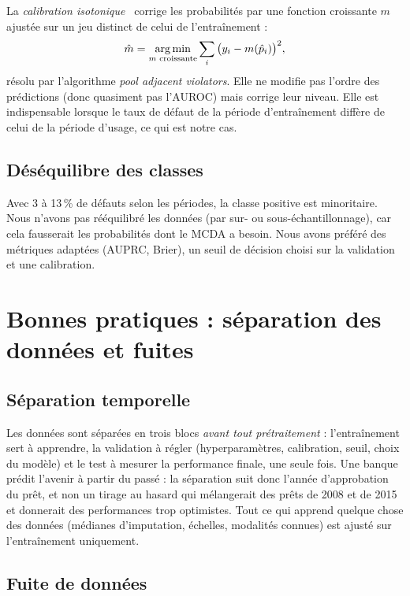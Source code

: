 La \emph{calibration isotonique}~\cite{zadrozny2002,niculescu2005} corrige les probabilités par une fonction
croissante $m$ ajustée sur un jeu distinct de celui de l'entraînement :
\begin{equation}
  \hat m = \operatorname*{arg\,min}_{m \text{ croissante}} \sum_{i} \big(y_i - m(\hat p_i)\big)^2 ,
\end{equation}
résolu par l'algorithme \textit{pool adjacent violators}. Elle ne modifie pas l'ordre des prédictions (donc
quasiment pas l'AUROC) mais corrige leur niveau. Elle est indispensable lorsque le taux de défaut de la période
d'entraînement diffère de celui de la période d'usage, ce qui est notre cas.

\subsection{Déséquilibre des classes}

Avec 3 à 13\,\% de défauts selon les périodes, la classe positive est minoritaire. Nous n'avons pas rééquilibré
les données (par sur- ou sous-échantillonnage), car cela fausserait les probabilités dont le MCDA a besoin. Nous
avons préféré des métriques adaptées (AUPRC, Brier), un seuil de décision choisi sur la validation et une calibration.

\section{Bonnes pratiques : séparation des données et fuites}

\subsection{Séparation temporelle}

Les données sont séparées en trois blocs \emph{avant tout prétraitement} : l'entraînement sert à apprendre, la
validation à régler (hyperparamètres, calibration, seuil, choix du modèle) et le test à mesurer la performance
finale, une seule fois. Une banque prédit l'avenir à partir du passé : la séparation suit donc l'année d'approbation
du prêt, et non un tirage au hasard qui mélangerait des prêts de 2008 et de 2015 et donnerait des performances
trop optimistes. Tout ce qui apprend quelque chose des données (médianes d'imputation, échelles, modalités
connues) est ajusté sur l'entraînement uniquement.

\subsection{Fuite de données}

